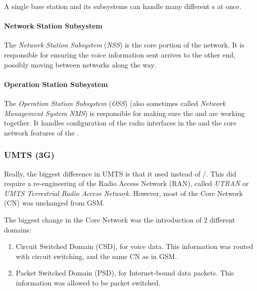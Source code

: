A single base station and its subsystems can handle many different s at once.

\paragraph{Network Station Subsystem}\label{par:Network_Station_Subsystem}
\begin{definition}\label{def:Network_Station_Subsystem}
  The \emph{Network Station Subsystem} (\emph{NSS}) is the core portion of the network.
  It is responsible for ensuring the voice information sent arrives to the other end, possibly moving between networks along the way.
\end{definition}

\paragraph{Operation Station Subsystem}\label{par:Operation_Station_Subsystem}
\begin{definition}\label{def:Operation_Station_Subsystem}
  The \emph{Operation Station Subsystem} (\emph{OSS}) (also sometimes called \emph{Network Management System} \emph{NMS}) is responsible for making sure the  and  are working together.
  It handles configuration of the radio interfaces in the  and the core network features of the .
\end{definition}

\subsubsection{UMTS (3G)}\label{subsubsec:3G}
Really, the biggest difference in UMTS is that it used  instead of /.
This did require a re-engineering of the Radio Access Network (RAN), called \emph{UTRAN} or \emph{UMTS Terrestrial Radio Access Network}.
However, most of the Core Network (CN) was unchanged from GSM.\@

The biggest change in the Core Network was the introduction of 2 different domains:
\begin{enumerate}[noitemsep]
\item Circuit Switched Domain (CSD), for voice data.
  This information was routed with circuit switching, and the same CN as in GSM.\@
\item Packet Switched Domain (PSD), for Internet-bound data packets.
  This information was allowed to be packet switched.
\end{enumerate}

